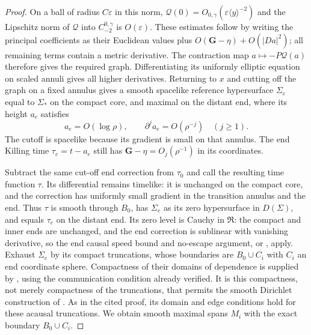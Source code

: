 \begin{proof}
On a ball of radius $C\varepsilon$ in this norm,
$\mathcal Q(0)=O_{0,\gamma}(\varepsilon\langle y\rangle^{-2})$
and the Lipschitz norm of $\mathcal Q$ into
$C^{0,\gamma}_{-2}$ is $O(\varepsilon)$.  These estimates follow
by writing the principal coefficients as their Euclidean values
plus $O(\mathbf G-\eta)+O(|Da|^2)$; all remaining terms contain
a metric derivative.  The contraction map $a\mapsto-P\mathcal Q(a)$
therefore gives the required graph.  Differentiating its uniformly
elliptic equation on scaled annuli gives all higher derivatives.
Returning to $x$ and cutting off the graph on a fixed annulus gives
a smooth spacelike reference hypersurface $\Sigma_e$ equal to
$\Sigma_*$ on the compact core, and maximal on the distant end, where its
height $a_e$ satisfies
\[
 a_e=O(\log\rho),\qquad \partial^j a_e=O(\rho^{-j})
 \quad(j\geq1).
\]
The cutoff is spacelike because its gradient is small on that
annulus.  The end Killing time $\tau_e=t-a_e$ still has
$\mathbf G-\eta=O_j(\rho^{-1})$ in its coordinates.

Subtract the same cut-off end correction from $\tau_0$ and
call the resulting time function $\tau$.  Its differential remains
timelike: it is unchanged on the compact core, and the correction
has uniformly small gradient in the transition annulus and the
end.  Thus $\tau$ is smooth through $B_0$, has $\Sigma_e$ as
its zero hypersurface in $D(\Sigma)$, and equals $\tau_e$ on the distant end.
Its zero level is Cauchy in $\mathfrak R$: the compact and inner
ends are unchanged, and the end correction is sublinear with
vanishing derivative, so the end causal speed bound and no-escape
argument, or \cite[Lemma~4.2]{ChruscielWald1994}, apply.
Exhaust $\Sigma_e$ by its
compact truncations, whose boundaries are $B_0\cup C_i$ with
$C_i$ an end coordinate sphere.  Compactness of their domains of
dependence is supplied by
\cite[Theorem~3.2]{ChruscielWald1994}, using the communication
condition already verified.  It is this compactness, not merely
compactness of the truncations, that permits the smooth Dirichlet
construction of \cite[Theorem~4.2]{Bartnik1984}.  As in the cited
proof, its domain and edge conditions hold for these acausal
truncations.  We obtain smooth maximal spans $M_i$ with the exact
boundary $B_0\cup C_i$.


\end{proof}
